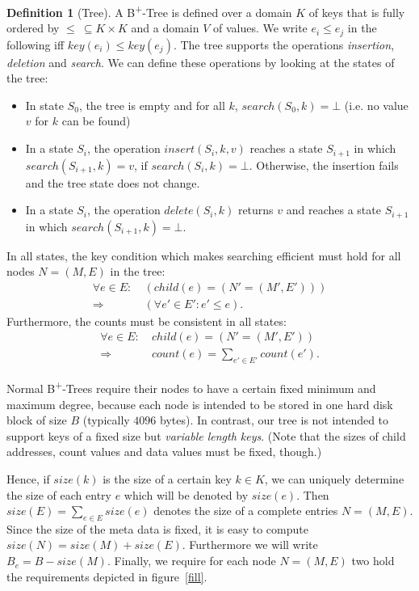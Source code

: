\documentclass[a4paper, 8pt, twoclumn]{scrartcl}
\theoremstyle{plain}
\theoremstyle{definition}
\newtheorem{defi}[thm]{Definition}
\theoremstyle{remark}
\newcommand{\BTree}{ B\textsuperscript{+}-Tree }
\newcommand{\BTrees}{ B\textsuperscript{+}-Trees }
\newcommand{\Beff}{B_e}
\begin{document}
\begin{multicols}{2}
\begin{defi}[Tree]
A \BTree is defined over a domain $K$ of keys that is fully ordered by
\mbox{$\leq \ \subseteq K \times K$} and a domain $V$ of values.
We write \mbox{$e_i \leq e_j$} in the following iff
\mbox{$key(e_i) \leq key(e_j)$}.
The tree supports the operations {\em insertion}, {\em deletion} and 
{\em search}. We can define these operations by looking at the states of the
tree:
\begin{itemize}
\item In state $S_0$, the tree is empty and for all $k$,
	\mbox{$search(S_0, k) = \bot$} (i.e. no value $v$ for $k$ can be found)
\item In a state $S_i$, the operation \mbox{$insert(S_i, k, v)$} reaches a
	state $S_{i+1}$ in which \mbox{$search(S_{i+1}, k) = v$},
	if \mbox{$search(S_i, k) = \bot$}. Otherwise, the insertion fails and the
	tree state does not change.
\item In a state $S_i$, the operation \mbox{$delete(S_i, k)$} returns $v$ and
	reaches a state $S_{i+1}$ in which \mbox{$search(S_{i+1}, k) = \bot$}.
\end{itemize}
In all states, the key condition which makes searching efficient must hold
for all nodes \mbox{$N = (M, E)$} in the tree:
\begin{align*}
\forall e \in E: \ & (child(e) = (N' = (M', E')))\\
     \Rightarrow \ & (\forall e' \in E': e' \leq e).
\end{align*}
Furthermore, the counts must be consistent in all states:
\begin{align*}
\forall e \in E: \ & child(e) = (N' = (M', E'))\\
     \Rightarrow \ & count(e) = \sum_{e' \in E'} count(e').
\end{align*}

Normal \BTrees require their nodes to have a certain fixed
minimum and maximum degree, because each node is intended to be stored in one
hard disk block of size $B$ (typically $4096$ bytes).
In contrast, our tree is not intended to support keys of a fixed size
but {\em variable length keys}.
(Note that the sizes of child addresses, count values and data values must be
fixed, though.)

Hence, if $size(k)$ is the size of a certain key $k \in K$, we can uniquely
determine the size of each entry $e$ which will be denoted by $size(e)$.
Then \mbox{$size(E) = \sum_{e \in E} size(e)$} denotes the size of a complete
entries \mbox{$N = (M, E)$}.
Since the size of the meta data is fixed, it is easy to compute 
\mbox{$size(N) = size(M) + size(E)$}.
Furthermore we will write \mbox{$\Beff = B - size(M)$}.
Finally, we require for each node \mbox{$N = (M, E)$} two hold the requirements
depicted in figure~\ref{fill}.
\end{defi}



\end{multicols}
\end{document}
